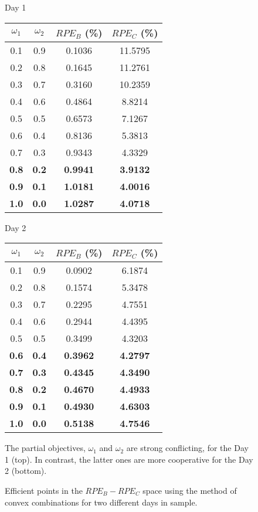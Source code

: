 \begin{figure}[h!]
\caption{Efficient points in the $RPE_B-RPE_C$ space using the method
  of convex combinations for two different days in sample. %
  \label{ParetoTwoDays}} 
\begin{center}
{\sc Day 1}\\[.1cm]
\begin{tabular}{cccc}
\hline \hline
$\omega_1$ & $\omega_2$  & $RPE_B$ (\%) & $RPE_C$ (\%) \\
\hline
0.1 &  0.9 &  0.1036 &  11.5795\\
0.2 &  0.8 &  0.1645 &  11.2761\\
0.3 &  0.7 &  0.3160 &  10.2359\\
0.4 &  0.6 &  0.4864 &   8.8214\\
0.5 &  0.5 &  0.6573 &   7.1267\\
0.6 &  0.4 &  0.8136 &   5.3813\\
0.7 &  0.3 &  0.9343 &   4.3329\\
{\bf 0.8} &  {\bf 0.2} &  {\bf 0.9941} & {\bf 3.9132}\\
{\bf 0.9} &  {\bf 0.1} &  {\bf 1.0181} & {\bf 4.0016}\\
{\bf 1.0} &  {\bf 0.0} &  {\bf 1.0287} & {\bf 4.0718}\\
\hline
\end{tabular}
\end{center}

\begin{center}
{\sc Day 2}\\[.1cm]
\begin{tabular}{cccc}
\hline \hline
$\omega_1$ & $\omega_2$  & $RPE_B$ (\%) & $RPE_C$ (\%) \\
\hline
0.1 &  0.9 &0.0902 &6.1874\\
0.2 &  0.8 &0.1574 &5.3478\\
0.3 &  0.7 &0.2295 &4.7551\\
0.4 &  0.6 &0.2944 &4.4395\\
0.5 &  0.5 &0.3499 &4.3203\\
{\bf 0.6} &  {\bf 0.4} & {\bf 0.3962} & {\bf 4.2797}\\
{\bf 0.7} &  {\bf 0.3} & {\bf 0.4345} & {\bf 4.3490}\\
{\bf 0.8} &  {\bf 0.2} & {\bf 0.4670} & {\bf 4.4933}\\
{\bf 0.9} &  {\bf 0.1} & {\bf 0.4930} & {\bf 4.6303}\\
{\bf 1.0} &  {\bf 0.0} &{\bf 0.5138} & {\bf 4.7546}\\
\hline
\end{tabular}
\end{center}
\begin{flushleft} The partial objectives, $\omega_1$ and $\omega_2$ are strong
  conflicting, for the Day 1 (top). In contrast, the latter ones are
  more cooperative for the Day 2 
  (bottom).
\end{flushleft}
\end{figure}

